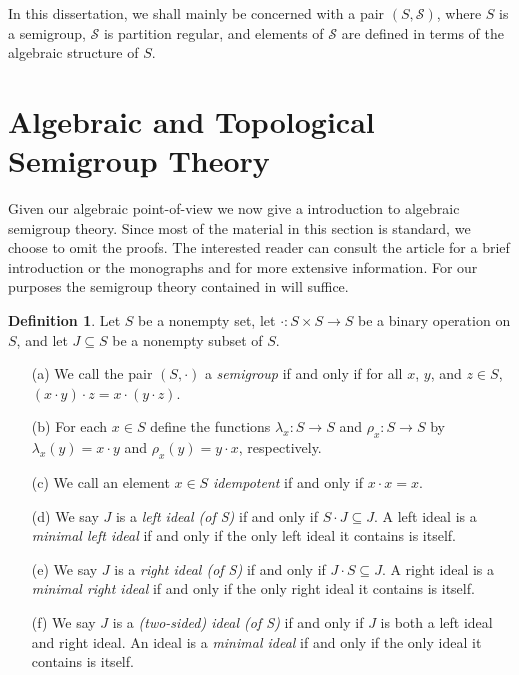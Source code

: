 \documentclass[12pt]{article}
\theoremstyle{plain}
\theoremstyle{definition}
\newtheorem{defn}[thm]{Definition}
\newcommand{\calS}{\mathcal{S}}
\begin{document}
In this dissertation, we shall mainly be concerned with a pair $(S, \calS)$, where $S$ is a semigroup, $\calS$ is partition regular, and elements of $\calS$ are defined in terms of the algebraic structure of $S$.

\section{Algebraic and Topological Semigroup Theory}
Given our algebraic point-of-view we now give a introduction to algebraic semigroup theory.
Since most of the material in this section is standard, we choose to omit the proofs.
The interested reader can consult the article \cite{Hollings:2007uq} for a brief introduction or the monographs \cite{Clifford:1961fk} and \cite{Clifford:1967fk} for more extensive information. 
For our purposes the semigroup theory contained in \cite[Chapters 1 and 2]{Hindman:1998fk} will suffice. 

\begin{defn}
  Let $S$ be a nonempty set, let $\cdot \colon S \times S \to S$ be
  a binary operation on $S$, and let $J \subseteq S$ be a nonempty
  subset of $S$.
  \begin{itemize}
    \item[(a)] We call the pair $(S, \cdot)$ a \textsl{semigroup} if
      and only if for all $x$, $y$, and $z \in S$, $(x \cdot y) \cdot
      z = x \cdot (y \cdot z)$.
    \item[(b)] For each $x \in S$ define the functions $\lambda_x
      \colon S \to S$ and $\rho_x \colon S \to S$ by $\lambda_x(y) = x
      \cdot y$ and $\rho_x(y) = y \cdot x$, respectively.
    \item[(c)] We call an element $x \in S$ \textsl{idempotent} if and
      only if $x\cdot x = x$. 
    \item[(d)] We say $J$ is a \textsl{left ideal (of S)} if and only
      if $S \cdot J \subseteq J$.
      A left ideal is a \textsl{minimal left ideal} if and only if the
      only left ideal it contains is itself.
    \item[(e)] We say $J$ is a \textsl{right ideal (of S)} if and only
      if $J \cdot S \subseteq J$.
      A right ideal is a \textsl{minimal right ideal} if and only if the
      only right ideal it contains is itself.
    \item[(f)] We say $J$ is a \textsl{(two-sided) ideal (of S)} if and only
      if $J$ is both a left ideal and right ideal.
      An ideal is a \textsl{minimal ideal} if and only if the only
      ideal it contains is itself.
  \end{itemize}
\end{defn}
\end{document}
